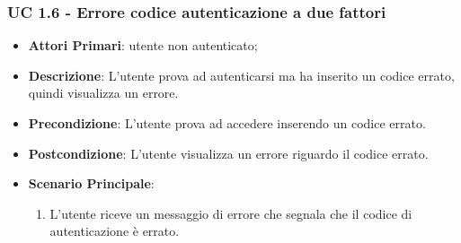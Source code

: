		\subsubsection{UC 1.6 - Errore codice autenticazione a due fattori}
		\begin{itemize}
			\item \textbf{Attori Primari}: utente non autenticato;
			\item \textbf{Descrizione}: L'utente prova ad autenticarsi ma ha inserito un codice errato, quindi visualizza un errore.
			\item \textbf{Precondizione}: L'utente prova ad accedere inserendo un codice errato.
			\item \textbf{Postcondizione}: L'utente visualizza un errore riguardo il codice errato.
			\item \textbf{Scenario Principale}:
			\begin{enumerate}
				\item L'utente riceve un messaggio di errore che segnala che il codice di autenticazione è errato.
			\end{enumerate}	
		\end{itemize}